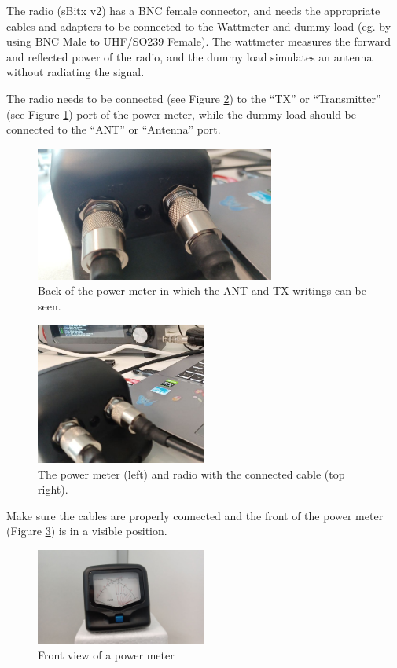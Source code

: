 \documentclass[11pt,a4paper]{article}
\begin{document}
The radio (sBitx v2) has a BNC female connector, and needs the appropriate cables and adapters to
be connected to the Wattmeter and dummy load (eg. by using BNC Male to UHF/SO239 Female). The wattmeter measures the forward and reflected power of the radio,
and the dummy load simulates an antenna without radiating the signal.

The radio needs to be connected (see Figure \ref{fig:backview4}) to the ``TX'' or ``Transmitter'' (see Figure \ref{fig:backview2}) port of the power meter, while the dummy load
should be connected to the ``ANT'' or ``Antenna'' port.

\begin{figure}[!ht]
  \centering
  \includegraphics[width=0.7\textwidth]{pictures/wattmeter_2.jpeg}
  \caption{Back of the power meter in which the ANT and TX writings can be seen.}
  \label{fig:backview2}
\end{figure}

\begin{figure}[!ht]
  \centering
  \includegraphics[width=0.5\textwidth]{pictures/wattmeter_4-edited.jpeg}
  \caption{The power meter (left) and radio with the connected cable (top right).}
  \label{fig:backview4}
\end{figure}

Make sure the cables are properly connected and the front of the power meter (Figure \ref{fig:frontview1})
is in a visible position.

\begin{figure}[!ht]
  \centering
  \includegraphics[width=0.5\textwidth]{pictures/wattmeter_5.jpeg}
  \caption{Front view of a power meter}
  \label{fig:frontview1}
\end{figure}
\end{document}
